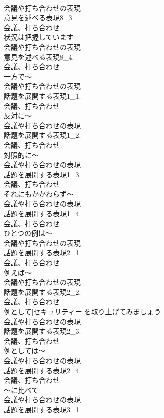 \documentclass[8pt]{extreport}
\begin{document}
\begin{CJK}{UTF8}{min}
\\	会議や打ち合わせの表現
\\	意見を述べる表現8_3.
\\	会議、打ち合わせ
\\	状況は把握しています	
\\	会議や打ち合わせの表現
\\	意見を述べる表現8_4.
\\	会議、打ち合わせ
\\	一方で～	
\\	会議や打ち合わせの表現
\\	話題を展開する表現1_1.
\\	会議、打ち合わせ
\\	反対に～	
\\	会議や打ち合わせの表現
\\	話題を展開する表現1_2.
\\	会議、打ち合わせ
\\	対照的に～	
\\	会議や打ち合わせの表現
\\	話題を展開する表現1_3.
\\	会議、打ち合わせ
\\	それにもかかわらず～	
\\	会議や打ち合わせの表現
\\	話題を展開する表現1_4.
\\	会議、打ち合わせ
\\	ひとつの例は～	
\\	会議や打ち合わせの表現
\\	話題を展開する表現2_1.
\\	会議、打ち合わせ
\\	例えば～	
\\	会議や打ち合わせの表現
\\	話題を展開する表現2_2.
\\	会議、打ち合わせ
\\	例として[セキュリティー]を取り上げてみましょう	
\\	会議や打ち合わせの表現
\\	話題を展開する表現2_3.
\\	会議、打ち合わせ
\\	例としては～	
\\	会議や打ち合わせの表現
\\	話題を展開する表現2_4.
\\	会議、打ち合わせ
\\	～に比べて	
\\	会議や打ち合わせの表現
\\	話題を展開する表現3_1.

\end{CJK}
\end{document}
